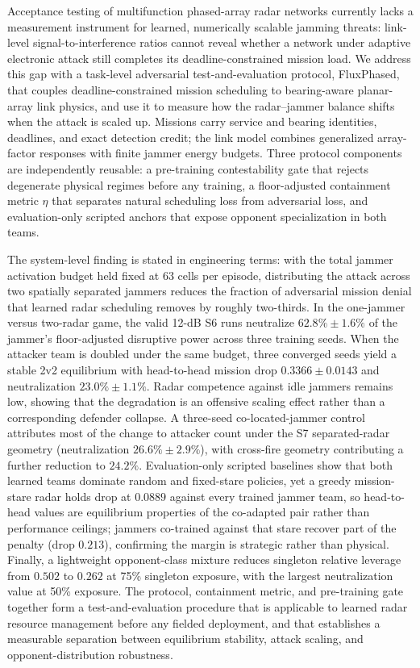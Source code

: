 Acceptance testing of multifunction phased-array radar networks currently lacks a measurement instrument for learned, numerically scalable jamming threats: link-level signal-to-interference ratios cannot reveal whether a network under adaptive electronic attack still completes its deadline-constrained mission load. We address this gap with a task-level adversarial test-and-evaluation protocol, FluxPhased, that couples deadline-constrained mission scheduling to bearing-aware planar-array link physics, and use it to measure how the radar--jammer balance shifts when the attack is scaled up. Missions carry service and bearing identities, deadlines, and exact detection credit; the link model combines generalized array-factor responses with finite jammer energy budgets. Three protocol components are independently reusable: a pre-training contestability gate that rejects degenerate physical regimes before any training, a floor-adjusted containment metric $\eta$ that separates natural scheduling loss from adversarial loss, and evaluation-only scripted anchors that expose opponent specialization in both teams.

The system-level finding is stated in engineering terms: with the total jammer activation budget held fixed at 63 cells per episode, distributing the attack across two spatially separated jammers reduces the fraction of adversarial mission denial that learned radar scheduling removes by roughly two-thirds. In the one-jammer versus two-radar game, the valid 12-dB S6 runs neutralize $62.8\%\pm1.6\%$ of the jammer's floor-adjusted disruptive power across three training seeds. When the attacker team is doubled under the same budget, three converged seeds yield a stable 2v2 equilibrium with head-to-head mission drop $0.3366\pm0.0143$ and neutralization $23.0\%\pm1.1\%$. Radar competence against idle jammers remains low, showing that the degradation is an offensive scaling effect rather than a corresponding defender collapse. A three-seed co-located-jammer control attributes most of the change to attacker count under the S7 separated-radar geometry (neutralization $26.6\%\pm2.9\%$), with cross-fire geometry contributing a further reduction to $24.2\%$. Evaluation-only scripted baselines show that both learned teams dominate random and fixed-stare policies, yet a greedy mission-stare radar holds drop at $0.0889$ against every trained jammer team, so head-to-head values are equilibrium properties of the co-adapted pair rather than performance ceilings; jammers co-trained against that stare recover part of the penalty (drop $0.213$), confirming the margin is strategic rather than physical. Finally, a lightweight opponent-class mixture reduces singleton relative leverage from $0.502$ to $0.262$ at 75\% singleton exposure, with the largest neutralization value at 50\% exposure. The protocol, containment metric, and pre-training gate together form a test-and-evaluation procedure that is applicable to learned radar resource management before any fielded deployment, and that establishes a measurable separation between equilibrium stability, attack scaling, and opponent-distribution robustness.
